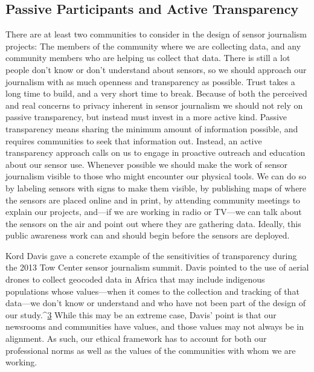\begin{itemize}
\section{Passive Participants and Active Transparency}

There are at least two communities to consider in the design of sensor journalism
projects: The members of the community where we are collecting
data, and any community members who are helping us collect that data.
There is still a lot people don't know or don't understand about sensors, so
we should approach our journalism with as much openness and transparency
as possible. Trust takes a long time to build, and a very short time to
break. Because of both the perceived and real concerns to privacy inherent
in sensor journalism we should not rely on passive transparency, but instead
must invest in a more active kind. Passive transparency means sharing the
minimum amount of information possible, and requires communities to
seek that information out. Instead, an active transparency approach calls
on us to engage in proactive outreach and education about our sensor use.
Whenever possible we should make the work of sensor journalism visible
to those who might encounter our physical tools. We can do so by labeling
sensors with signs to make them visible, by publishing maps of where the
sensors are placed online and in print, by attending community meetings to
explain our projects, and—if we are working in radio or TV—we can talk
about the sensors on the air and point out where they are gathering data.
Ideally, this public awareness work can and should begin before the sensors
are deployed.

Kord Davis gave a concrete example of the sensitivities of transparency during
the 2013 Tow Center sensor journalism summit. Davis pointed to the
use of aerial drones to collect geocoded data in Africa that may include
indigenous populations whose values—when it comes to the collection and
tracking of that data—we don't know or understand and who have not been
part of the design of our study.^{\href{#endnotes-stearns}{3}} While this may be an extreme case, Davis'
point is that our newsrooms and communities have values, and those values
may not always be in alignment. As such, our ethical framework has to
account for both our professional norms as well as the values of the communities
with whom we are working.


\end{itemize}
